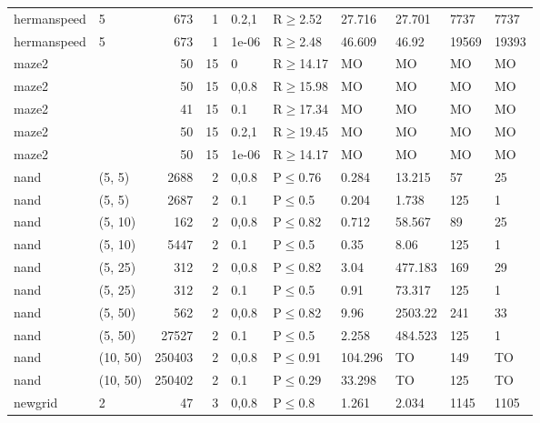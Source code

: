 \begin{longtable}{llrrllllll}
 hermanspeed   & 5        &    	673 &   1 & 0.2,1 & R$\geq$2.52  & 27.716  & 27.701  & 7737    & 7737   \\
 hermanspeed   & 5        &    	673 &   1 & 1e-06 & R$\geq$2.48  & 46.609  & 46.92   & 19569   & 19393  \\
 maze2         &          &     	50 &  15 & 0     & R$\geq$14.17 & MO      & MO      & MO      & MO     \\
 maze2         &          &     	50 &  15 & 0,0.8 & R$\geq$15.98 & MO      & MO      & MO      & MO     \\
 maze2         &          &     	41 &  15 & 0.1   & R$\geq$17.34 & MO      & MO      & MO      & MO     \\
 maze2         &          &     	50 &  15 & 0.2,1 & R$\geq$19.45 & MO      & MO      & MO      & MO     \\
 maze2         &          &     	50 &  15 & 1e-06 & R$\geq$14.17 & MO      & MO      & MO      & MO     \\
 nand          & (5, 5)   &   	2688 &   2 & 0,0.8 & P$\leq$0.76  & 0.284   & 13.215  & 57      & 25     \\
 nand          & (5, 5)   &   	2687 &   2 & 0.1   & P$\leq$0.5   & 0.204   & 1.738   & 125     & 1      \\
 nand          & (5, 10)  &    	162 &   2 & 0,0.8 & P$\leq$0.82  & 0.712   & 58.567  & 89      & 25     \\
 nand          & (5, 10)  &   	5447 &   2 & 0.1   & P$\leq$0.5   & 0.35    & 8.06    & 125     & 1      \\
 nand          & (5, 25)  &    	312 &   2 & 0,0.8 & P$\leq$0.82  & 3.04    & 477.183 & 169     & 29     \\
 nand          & (5, 25)  &    	312 &   2 & 0.1   & P$\leq$0.5   & 0.91    & 73.317  & 125     & 1      \\
 nand          & (5, 50)  &    	562 &   2 & 0,0.8 & P$\leq$0.82  & 9.96    & 2503.22 & 241     & 33     \\
 nand          & (5, 50)  &  	27527 &   2 & 0.1   & P$\leq$0.5   & 2.258   & 484.523 & 125     & 1      \\
 nand          & (10, 50) & 	250403 &   2 & 0,0.8 & P$\leq$0.91  & 104.296 & TO      & 149     & TO     \\
 nand          & (10, 50) & 	250402 &   2 & 0.1   & P$\leq$0.29  & 33.298  & TO      & 125     & TO     \\
 newgrid       & 2        &     	47 &   3 & 0,0.8 & P$\leq$0.8   & 1.261   & 2.034   & 1145    & 1105   \\

\end{longtable}
